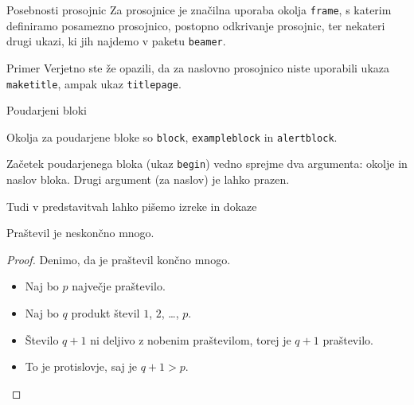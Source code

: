 \begin{frame}{Posebnosti prosojnic}
	Za prosojnice je značilna uporaba okolja \texttt{frame},
	s katerim definiramo posamezno prosojnico,
	\pause
	postopno odkrivanje prosojnic,
	\pause
	ter nekateri drugi ukazi, ki jih najdemo v paketu \texttt{beamer}.
	\pause
	\begin{exampleblock}{Primer}
		Verjetno ste že opazili, da za naslovno prosojnico niste uporabili
		ukaza \texttt{maketitle}, ampak ukaz \texttt{titlepage}.
	\end{exampleblock}
\end{frame}

\begin{frame}{Poudarjeni bloki}

		
		\begin{block}{}
			Okolja za poudarjene bloke so \texttt{block}, \texttt{exampleblock} in \texttt{alertblock}.
		\end{block}

		
		\begin{alertblock}{}
			Začetek poudarjenega bloka (ukaz \texttt{begin}) vedno sprejme 
			dva argumenta: okolje in naslov bloka.
			Drugi argument (za naslov) je lahko prazen. 
		\end{alertblock}

\end{frame}

\begin{frame}{Tudi v predstavitvah lahko pišemo izreke in dokaze}


	\begin{izrek}
	   Praštevil je neskončno mnogo.
	\end{izrek}
	\begin{proof}
	   Denimo, da je praštevil končno mnogo.
	   	\begin{itemize}[<+->]
		  \item Naj bo \(p\) \alert<4>{največje} praštevilo.
		  \item Naj bo \(q\) produkt števil \(1\), \(2\), \ldots, \(p\).
		  \item Število \(q+1\) ni deljivo z nobenim praštevilom, torej je \(q+1\) praštevilo.
		  \item To je protislovje, saj je \(q+1>p\). \qedhere
	   	\end{itemize}
	\end{proof}
\end{frame}
 
